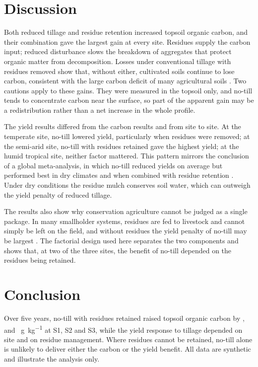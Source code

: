 \section{Discussion}

Both reduced tillage and residue retention increased topsoil organic carbon,
and their combination gave the largest gain at every site. Residues supply the
carbon input; reduced disturbance slows the breakdown of aggregates that
protect organic matter from decomposition. Losses under conventional tillage
with residues removed show that, without either, cultivated soils continue to
lose carbon, consistent with the large carbon deficit of many agricultural
soils \parencite{lal2004}. Two cautions apply to these gains. They were
measured in the topsoil only, and no-till tends to concentrate carbon near the
surface, so part of the apparent gain may be a redistribution rather than a
net increase in the whole profile.

The yield results differed from the carbon results and from site to site. At
the temperate site, no-till lowered yield, particularly when residues were
removed; at the semi-arid site, no-till with residues retained gave the
highest yield; at the humid tropical site, neither factor mattered. This
pattern mirrors the conclusion of a global meta-analysis, in which no-till
reduced yields on average but performed best in dry climates and when combined
with residue retention \parencite{pittelkow2016}. Under dry conditions the
residue mulch conserves soil water, which can outweigh the yield penalty of
reduced tillage.

The results also show why conservation agriculture cannot be judged as a
single package. In many smallholder systems, residues are fed to livestock and
cannot simply be left on the field, and without residues the yield penalty of
no-till may be largest \parencite{giller2009}. The factorial design used here
separates the two components and shows that, at two of the three sites, the
benefit of no-till depended on the residues being retained.

\section{Conclusion}

Over five years, no-till with residues retained raised topsoil organic carbon
by ,  and
~\si{\gram\per\kilo\gram} at S1, S2 and S3, while the
yield response to tillage depended on site and on residue management. Where
residues cannot be retained, no-till alone is unlikely to deliver either the
carbon or the yield benefit. All data are synthetic and illustrate the
analysis only.
